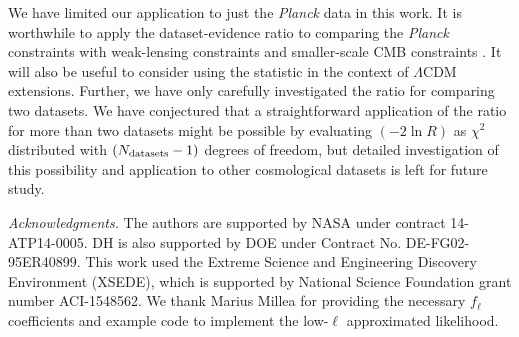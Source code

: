 \documentclass[amsmath, prl, reprint, aps]{revtex4-1}
\begin{document}
    We have limited our application to just the {\it Planck} data in this work. It is worthwhile to apply the dataset-evidence ratio to comparing the {\it Planck} constraints with weak-lensing constraints \cite{Abbott:2017wau} and smaller-scale CMB constraints \cite{Aylor:2017haa}. It will also be useful to consider using the statistic in the context of $\Lambda$CDM extensions. Further, we have only carefully investigated the ratio for comparing two datasets. We have conjectured that a straightforward application of the ratio for more than two datasets might be possible by evaluating $(-2\ln R)$ as $\chi^2$ distributed with $(N_{\rm datasets}-1)$ degrees of freedom, but detailed investigation of this possibility and application to other cosmological datasets is left for future study.
    
    \medskip
    \textit{Acknowledgments.}
    The authors are supported by NASA under contract 14-ATP14-0005. DH is also supported by DOE under
    Contract No. DE-FG02-95ER40899. This work used the Extreme Science and Engineering Discovery Environment (XSEDE), which is supported by National Science Foundation grant number ACI-1548562. We thank Marius Millea for providing the necessary $f_\ell$ coefficients and example code to implement the low-$\ell$ approximated likelihood.
    
    
    
    
\end{document}
